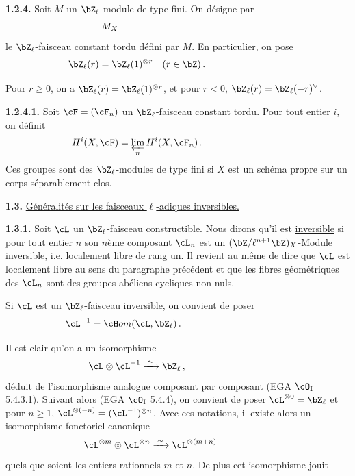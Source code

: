 \smallskip

\noindent
\textbf{1.2.4.} Soit $M$ un $\bZ_{\ell}$-module de type fini. On d\'esigne par
\[
M_X\hspace*{5cm}
\]
le $\bZ_{\ell}$-faisceau constant tordu d\'efini par $M$. En particulier, on pose
\[
\bZ_{\ell}(r) = \bZ_{\ell}(1)^{\otimes r} \quad (r \in \bZ)\,.\hspace*{3cm}
\]

Pour $r \geq 0$, on a $\bZ_{\ell}(r) = \bZ_{\ell}(1)^{\otimes r}$, et pour $r < 0$, $\bZ_{\ell}(r) = \bZ_{\ell}(-r)^{\vee}$.

\newpage

\noindent
\textbf{1.2.4.1.} Soit $\cF = (\cF_n)$ un $\bZ_{\ell}$-faisceau constant tordu. Pour tout entier $i$, on d\'efinit
\[
H^i(X, \cF) = \varprojlim_{n} H^i(X, \cF_n)\,.\hspace*{3cm}
\]
Ces groupes sont des $\bZ_{\ell}$-modules de type fini si $X$ est un sch\'ema propre sur un corps s\'eparablement clos.

\bigskip

\noindent
\textbf{1.3.} \underline{G\'en\'eralit\'es sur les faisceaux $\ell$-adiques inversibles.}

\noindent
\textbf{1.3.1.} Soit $\cL$ un $\bZ_{\ell}$-faisceau constructible. Nous dirons qu'il est \underline{inversible} si pour tout entier $n$ son $n$\`eme composant $\cL_n$ est un $(\bZ/\ell^{n+1}\bZ)_X$-Module inversible, i.e. localement libre de rang un. Il revient au m\^eme de dire que $\cL$ est localement libre au sens du paragraphe pr\'ec\'edent et que les fibres g\'eom\'etriques des $\cL_n$ sont des groupes ab\'eliens cycliques non nuls.

Si $\cL$ est un $\bZ_{\ell}$-faisceau inversible, on convient de poser
\[
\cL^{-1} = \cH om(\cL, \bZ_{\ell})\,.\hspace*{4cm}
\]

Il est clair qu'on a un isomorphisme
\[
\cL \otimes \cL^{-1} \xrightarrow{\;\sim\;} \bZ_{\ell}\,,\hspace*{3cm}
\]
d\'eduit de l'isomorphisme analogue composant par composant (EGA $\cO_{\mathrm{I}}$ 5.4.3.1). Suivant alors (EGA $\cO_{\mathrm{I}}$ 5.4.4), on convient de poser $\cL^{\otimes 0} = \bZ_{\ell}$ et pour $n \geq 1$, $\cL^{\otimes (-n)} = (\cL^{-1})^{\otimes n}$. Avec ces notations, il existe alors un isomorphisme fonctoriel canonique
\[
\cL^{\otimes m} \otimes \cL^{\otimes n} \xrightarrow{\;\sim\;} \cL^{\otimes (m+n)}\hspace*{2cm}
\]
quels que soient les entiers rationnels $m$ et $n$. De plus cet isomorphisme jouit

